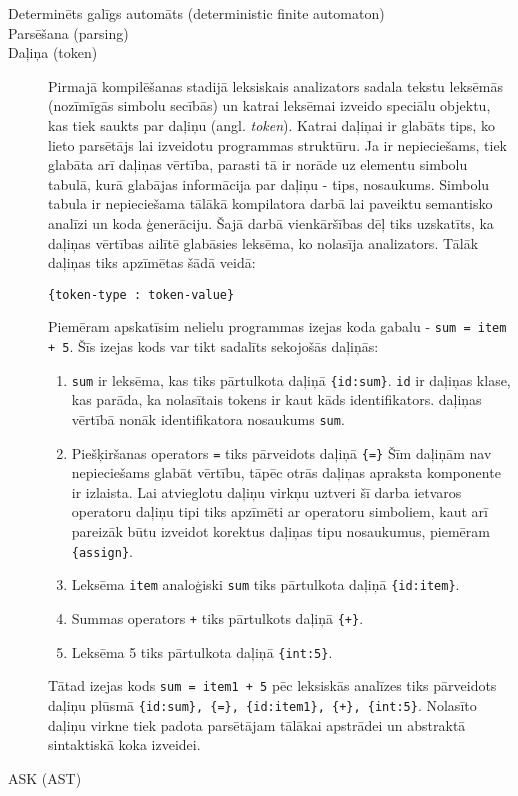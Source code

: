 \begin{description}
\item[Determinēts galīgs automāts (deterministic finite automaton)]


\item[Parsēšana (parsing)]


\item[Daļiņa (token)]
Pirmajā kompilēšanas stadijā leksiskais analizators sadala tekstu leksēmās (nozīmīgās simbolu secībās) un katrai leksēmai izveido speciālu objektu, kas tiek saukts par daļiņu (angl. \emph{token}). Katrai daļiņai ir glabāts tips, ko lieto parsētājs lai izveidotu programmas struktūru. Ja ir nepieciešams, tiek glabāta arī daļiņas vērtība, parasti tā ir norāde uz elementu simbolu tabulā, kurā glabājas informācija par daļiņu - tips, nosaukums. Simbolu tabula ir nepieciešama tālākā kompilatora darbā lai paveiktu semantisko analīzi un koda ģenerāciju. Šajā darbā vienkāršības dēļ tiks uzskatīts, ka daļiņas vērtības ailītē glabāsies leksēma, ko nolasīja analizators. Tālāk daļiņas tiks apzīmētas šādā veidā:

\begin{verbatim}
{token-type : token-value}
\end{verbatim}

Piemēram apskatīsim nelielu programmas izejas koda gabalu - \verb|sum = item + 5|. Šīs izejas kods var tikt sadalīts sekojošās daļiņās:
\begin{enumerate}
\item \verb|sum| ir leksēma, kas tiks pārtulkota daļiņā \verb|{id:sum}|. \verb|id| ir daļiņas klase, kas parāda, ka nolasītais tokens ir kaut kāds identifikators. daļiņas vērtībā nonāk identifikatora nosaukums \verb|sum|.
\item Piešķiršanas operators \verb|=| tiks pārveidots daļiņā \verb|{=}| Šīm daļiņām nav nepieciešams glabāt vērtību, tāpēc otrās daļiņas apraksta komponente ir izlaista. Lai atvieglotu daļiņu virkņu uztveri šī darba ietvaros operatoru daļiņu tipi tiks apzīmēti ar operatoru simboliem, kaut arī pareizāk būtu izveidot korektus daļiņas tipu nosaukumus, piemēram \verb|{assign}|.
\item Leksēma \verb|item| analoģiski \verb|sum| tiks pārtulkota daļiņā \verb|{id:item}|.
\item Summas operators \verb|+| tiks pārtulkots daļiņā \verb|{+}|.
\item Leksēma 5 tiks pārtulkota daļiņā \verb|{int:5}|.
\end{enumerate}

Tātad izejas kods \verb|sum = item1 + 5| pēc leksiskās analīzes tiks pārveidots daļiņu plūsmā \verb|{id:sum}, {=}, {id:item1}, {+}, {int:5}|. Nolasīto daļiņu virkne tiek padota parsētājam tālākai apstrādei un abstraktā sintaktiskā koka izveidei. \cite{DragonBook}

\item[ASK (AST)]

\end{description}